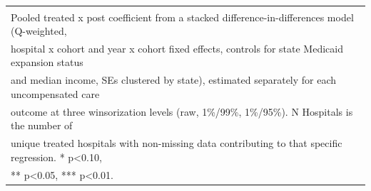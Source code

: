 \begin{table}[!h]
\begin{tabular}[t]{llrrr}
\bottomrule
\multicolumn{5}{l}{\textsuperscript{} Pooled treated x post coefficient from a stacked difference-in-differences model (Q-weighted,}\\
\multicolumn{5}{l}{hospital x cohort and year x cohort fixed effects, controls for state Medicaid expansion status}\\
\multicolumn{5}{l}{and median income, SEs clustered by state), estimated separately for each uncompensated care}\\
\multicolumn{5}{l}{outcome at three winsorization levels (raw, 1\%/99\%, 1\%/95\%). N Hospitals is the number of}\\
\multicolumn{5}{l}{unique treated hospitals with non-missing data contributing to that specific regression. * p<0.10,}\\
\multicolumn{5}{l}{** p<0.05, *** p<0.01.}\\
\end{tabular}
\end{table}
